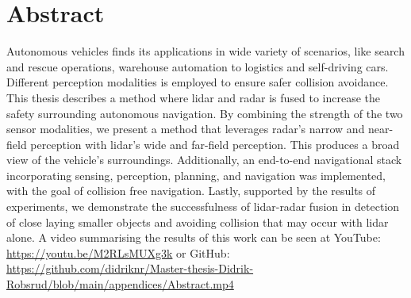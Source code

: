 \chapter*{Abstract}





Autonomous vehicles finds its applications in wide variety of scenarios, like search and rescue operations, warehouse automation to logistics and self-driving cars. Different perception modalities is employed to ensure safer collision avoidance. This thesis describes a method where lidar and radar is fused to increase the safety surrounding autonomous navigation. By combining the strength of the two sensor modalities, we present a method that leverages radar's narrow and near-field perception with lidar's wide and far-field perception. This produces a broad view of the vehicle's surroundings. Additionally, an end-to-end navigational stack incorporating sensing, perception, planning, and navigation was implemented, with the goal of collision free navigation. Lastly, supported by the results of experiments, we demonstrate the successfulness of lidar-radar fusion in detection of close laying smaller objects and avoiding collision that may occur with lidar alone. A video summarising the results of this work can be seen at YouTube: \url{https://youtu.be/M2RLsMUXg3k} or GitHub: \url{https://github.com/didriknr/Master-thesis-Didrik-Robsrud/blob/main/appendices/Abstract.mp4}